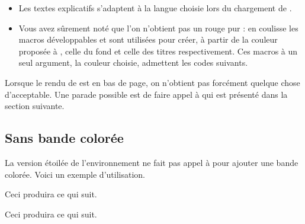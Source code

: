 \begin{bdocinfo}
    \leavevmode
    
    \begin{itemize}
    	\item Les textes explicatifs s'adaptent à la langue choisie lors du chargement de .

    	\item Vous avez sûrement noté que l'on n'obtient pas un rouge pur : en coulisse les macros développables  et  sont utilisées pour créer, à partir de la couleur proposée à , celle du fond et celle des titres respectivement.
	          Ces macros à un seul argument, la couleur choisie, admettent les codes suivants.

		      \begin{bdoclatex}[code]

		      \end{bdoclatex}
    \end{itemize}
\end{bdocinfo}




\begin{bdocwarning}
    Lorsque le rendu de  est en bas de page, on n'obtient pas forcément quelque chose d'acceptable.
    Une parade possible est de faire appel à  qui est présenté dans la section suivante. 
\end{bdocwarning}




\subsection{Sans bande colorée} 

\begin{bdocexa}
	La version étoilée de l'environnement  ne fait pas appel à  pour ajouter une bande colorée.
	Voici un exemple d'utilisation.


	Ceci produira ce qui suit.

	\medskip
	
	
\end{bdocexa}




\begin{bdocexa}
	\leavevmode


	Ceci produira ce qui suit.

	\medskip
	
	
\end{bdocexa}


